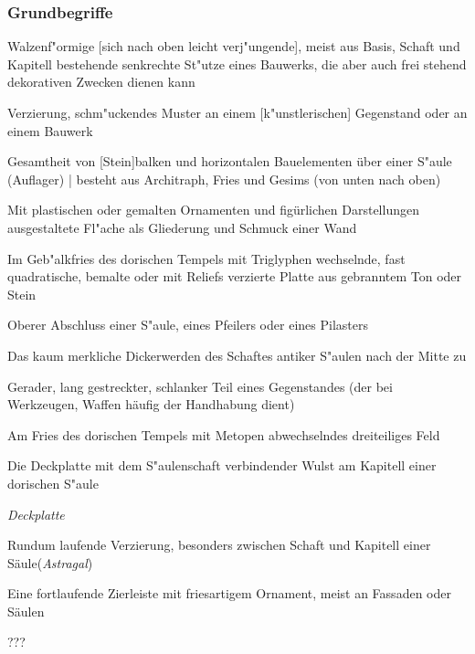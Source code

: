 \documentclass[emulatestandardclasses]{scrartcl}
\begin{document}
\subsubsection{Grundbegriffe}

\begin{description}[leftmargin=!,labelwidth=\widthof{\bfseries Perlenstab}]
  \item[S"aule] Walzenf"ormige [sich nach oben leicht verj"ungende], meist aus Basis, Schaft und Kapitell bestehende senkrechte St"utze eines Bauwerks, die aber auch frei stehend dekorativen Zwecken dienen kann
  \item[Ornament] Verzierung, schm"uckendes Muster an einem [k"unstlerischen] Gegenstand oder an einem Bauwerk
  \item[Geb"alk] Gesamtheit von [Stein]balken und horizontalen Bauelementen über einer S"aule (Auflager) | besteht aus Architraph, Fries und Gesims (von unten nach oben)
  \item[Fries] Mit plastischen oder gemalten Ornamenten und figürlichen Darstellungen ausgestaltete Fl"ache als Gliederung und Schmuck einer Wand
  \item[Metope] Im Geb"alkfries des dorischen Tempels mit Triglyphen wechselnde, fast quadratische, bemalte oder mit Reliefs verzierte Platte aus gebranntem Ton oder Stein
  \item[Kapitell] Oberer Abschluss einer S"aule, eines Pfeilers oder eines Pilasters
  \item[Entasis] Das kaum merkliche Dickerwerden des Schaftes antiker S"aulen nach der Mitte zu
  \item[Schaft] Gerader, lang gestreckter, schlanker Teil eines Gegenstandes (der bei Werkzeugen, Waffen häufig der Handhabung dient)
  \item[Triglyph] Am Fries des dorischen Tempels mit Metopen abwechselndes dreiteiliges Feld
  \item[Echinus] Die Deckplatte mit dem S"aulenschaft verbindender Wulst am Kapitell einer dorischen S"aule
  \item[Abakus] \emph{Deckplatte}
  \item[Perlenstab] Rundum laufende Verzierung, besonders zwischen Schaft und Kapitell einer Säule(\emph{Astragal})
  \item[Eierstab] Eine fortlaufende Zierleiste mit friesartigem Ornament, meist an Fassaden oder Säulen
  \item[Kannelur] ???
\end{description}
\end{document}
